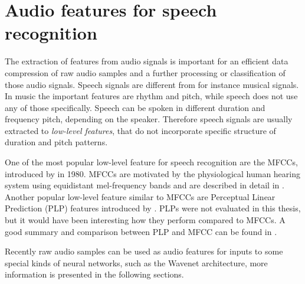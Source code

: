 
\section{Audio features for speech recognition}\label{sec:pref_features}
\thesisStateRevised
The extraction of features from audio signals is important for an efficient data compression of raw audio samples and a further processing or classification of those audio signals.
Speech signals are different from for instance musical signals.
In music the important features are rhythm and pitch, while speech does not use any of those specifically.
Speech can be spoken in different duration and frequency pitch, depending on the speaker.
Therefore speech signals are usually extracted to \emph{low-level features}, that do not incorporate specific structure of duration and pitch patterns.

One of the most popular low-level feature for speech recognition are the MFCCs, introduced by \cite{Mermelstein1980} in 1980.
MFCCs are motivated by the physiological human hearing system using equidistant mel-frequency bands and are described in detail in .
Another popular low-level feature similar to MFCCs are Perceptual Linear Prediction (PLP) features introduced by \cite{Hermansky1987}.
PLPs were not evaluated in this thesis, but it would have been interesting how they perform compared to MFCCs.
A good summary and comparison between PLP and MFCC can be found in \cite{Hoenig2005}.

Recently raw audio samples can be used as audio features for inputs to some special kinds of neural networks, such as the Wavenet architecture, more information is presented in the following sections.

